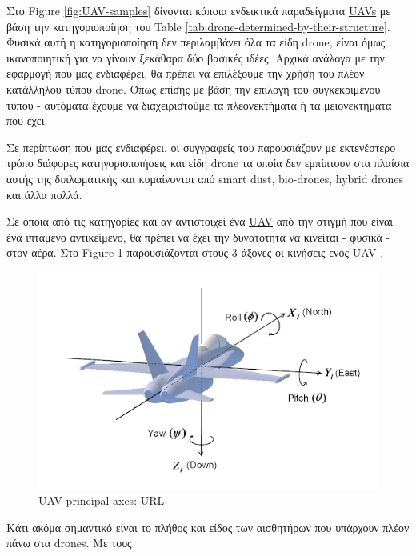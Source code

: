 Στο Figure \ref{fig:UAV-samples} δίνονται κάποια ενδεικτικά παραδείγματα \hyperref[abbr:UAV]{UAVs} με βάση την κατηγοριοποίηση
του Table \ref{tab:drone-determined-by-their-structure}.
Φυσικά αυτή η κατηγοριοποίηση δεν περιλαμβάνει όλα τα είδη drone, είναι όμως ικανοποιητική για να γίνουν
ξεκάθαρα δύο βασικές ιδέες. Αρχικά ανάλογα με την εφαρμογή που μας ενδιαφέρει, θα πρέπει να επιλέξουμε
την χρήση του πλέον κατάλληλου τύπου drone. Όπως επίσης με βάση την επιλογή του συγκεκριμένου τύπου -
αυτόματα έχουμε να διαχειριστούμε τα πλεονεκτήματα ή τα μειονεκτήματα που έχει.

Σε περίπτωση που μας ενδιαφέρει, οι συγγραφείς του \cite{drone-classification} παρουσιάζουν 
με εκτενέστερο τρόπο διάφορες κατηγοριοποιήσεις
και είδη drone τα οποία δεν εμπίπτουν στα πλαίσια αυτής της διπλωματικής και κυμαίνονται 
από smart dust, bio-drones, hybrid drones και άλλα πολλά.

Σε όποια από τις κατηγορίες και αν αντιστοιχεί ένα \hyperref[abbr:UAV]{UAV}
από την στιγμή που είναι ένα ιπτάμενο αντικείμενο, θα πρέπει να έχει την δυνατότητα να κινείται -
φυσικά - στον αέρα. Στο Figure \ref{fig:UAV-principal-axes} παρουσιάζονται στους 3 άξονες οι κινήσεις
ενός \hyperref[abbr:UAV]{UAV} \cite{aircraft-principal-axes}.

\begin{figure} [H]
	\centering
	\includegraphics[scale=0.6]{Images/Introduction/aircraft-principal-axes.png}
	\decoRule
	\caption[UAV]{\hyperref[abbr:UAV]{UAV} principal axes: \href{http://www.chrobotics.com/library/understanding-euler-angles}{URL}}
	\label{fig:UAV-principal-axes}
\end{figure}

Κάτι ακόμα σημαντικό είναι το πλήθος και είδος των αισθητήρων που υπάρχουν πλέον πάνω στα drones.
Με τους 

